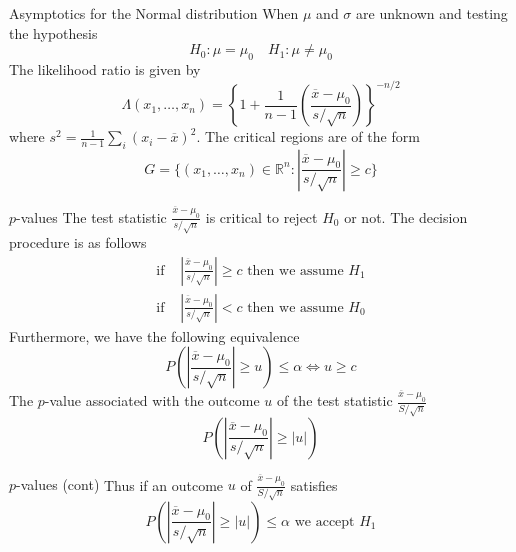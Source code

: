 \documentclass{beamer}
\begin{document}
\begin{frame}{Asymptotics for the Normal distribution}
	When $\mu$ and $\sigma$ are unknown and testing the hypothesis
	\begin{equation*}
		H_0 \colon \mu=\mu_0 \quad H_1 \colon \mu \ne \mu_0
	\end{equation*}
The likelihood ratio is given by
\begin{equation*}
	\Lambda(x_1,\ldots, x_n)= \left\{ 1+ \frac{1}{n-1}\left( \frac{\overline{x}-\mu_0}{s/\sqrt{n}}\right)\right\}^{-n/2}
\end{equation*}
where $s^2= \frac{1}{n-1}\sum_{i}(x_i-\overline{x})^2$. The critical regions are of the form
\begin{equation*}
	G= \{ (x_1,\ldots, x_n)\in \mathbb{R}^n: \left|\frac{\overline{x}-\mu_0}{s/\sqrt{n}} \right|\ge c\}
\end{equation*}
\end{frame}
\begin{frame}{$p$-values}
	The test statistic $\frac{\overline{x}-\mu_0}{s/\sqrt{n}}$ is critical to reject $H_0$ or not. The decision procedure is as follows
	\begin{equation*}
		\begin{split}
		\text{if }&\left| \frac{\overline{x}-\mu_0}{s/\sqrt{n}} \right| \ge c \text{ then we assume }H_1\\
			\text{if }&\left| \frac{\overline{x}-\mu_0}{s/\sqrt{n}} \right| <c \text{ then we assume }H_0
		\end{split}
	\end{equation*}
Furthermore, we have the following equivalence
\begin{equation*}
	P\left(	\left| \frac{\overline{x}-\mu_0}{s/\sqrt{n}} \right| \ge u \right)\le \alpha \iff u \ge c
\end{equation*}
The $p$-value associated with the outcome $u$ of the test statistic $\frac{\overline{x}-\mu_0}{S/\sqrt{n}}$ 
\begin{equation*}
	P\left(	\left| \frac{\overline{x}-\mu_0}{s/\sqrt{n}} \right| \ge |u| \right)
\end{equation*}
\end{frame}

\begin{frame}{$p$-values (cont)}
	Thus if an outcome $u$ of $\frac{\overline{x}-\mu_0}{S/\sqrt{n}}$  satisfies 
	\begin{equation*}
		P\left(	\left| \frac{\overline{x}-\mu_0}{s/\sqrt{n}} \right| \ge |u| \right) \le \alpha \text{ we accept }H_1
	\end{equation*}
	
\end{frame}
\end{document}
